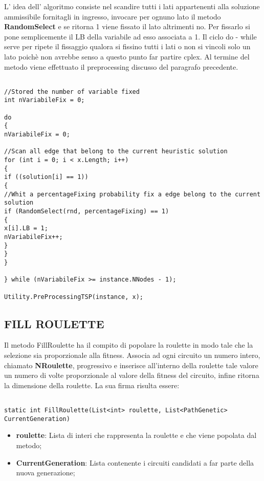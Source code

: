 \documentclass[11pt]{article}
\begin{document}
L' idea dell' algoritmo consiste nel scandire tutti i lati appartenenti alla soluzione ammissibile fornitagli in ingresso, invocare per ognuno lato il metodo \textbf{RandomSelect} e se ritorna 1 viene fissato il lato altrimenti no. Per fissarlo si pone semplicemente il LB della variabile ad esso associata a 1.  Il ciclo do - while serve per ripete il fissaggio qualora si fissino tutti i lati o non si vincoli solo un lato poichè non avrebbe senso a questo punto far partire cplex. Al termine del metodo viene effettuato il preprocessing discusso del paragrafo precedente.

\begin{lstlisting}

//Stored the number of variable fixed
int nVariabileFix = 0;

do
{
nVariabileFix = 0;

//Scan all edge that belong to the current heuristic solution
for (int i = 0; i < x.Length; i++)
{
if ((solution[i] == 1))
{
//Whit a percentageFixing probability fix a edge belong to the current solution
if (RandomSelect(rnd, percentageFixing) == 1)
{
x[i].LB = 1;
nVariabileFix++;
}
}
}

} while (nVariabileFix >= instance.NNodes - 1);

Utility.PreProcessingTSP(instance, x);

\end{lstlisting}

\subsection*{FILL ROULETTE}
\label{sec:FillRouletteS}

Il metodo FillRoulette ha il compito di popolare la roulette in modo tale che la selezione sia proporzionale alla fitness. Associa ad ogni circuito un numero intero, chiamato \textbf{NRoulette}, progressivo e inserisce all'interno della roulette tale valore un numero di volte proporzionale al valore della fitness del circuito, infine ritorna la dimensione della roulette. La sua firma risulta essere:

\begin{lstlisting}

static int FillRoulette(List<int> roulette, List<PathGenetic> CurrentGeneration)

\end{lstlisting}

\begin{itemize}
    \item \textbf{roulette}: Lista di interi che rappresenta la roulette e che viene popolata dal metodo;
    \item \textbf{CurrentGeneration}: Lista contenente i circuiti candidati a far parte della nuova generazione;
\end{itemize}
\end{document}
